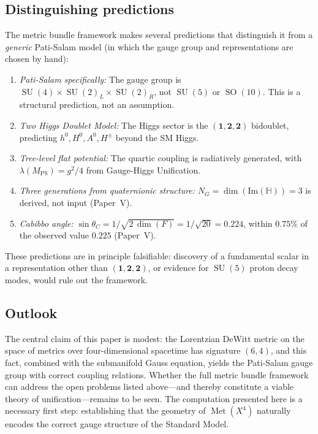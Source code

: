 \documentclass[12pt,a4paper]{article}
\theoremstyle{definition}
\newcommand{\Met}{\operatorname{Met}}
\newcommand{\SO}{\operatorname{SO}}
\newcommand{\SU}{\operatorname{SU}}
\begin{document}
\subsection{Distinguishing predictions}

The metric bundle framework makes several predictions that distinguish it from a \emph{generic} Pati-Salam model (in which the gauge group and representations are chosen by hand):
\begin{enumerate}[nosep]
\item \emph{Pati-Salam specifically:} The gauge group is $\SU(4) \times \SU(2)_L \times \SU(2)_R$, not $\SU(5)$ or $\SO(10)$.
This is a structural prediction, not an assumption.
\item \emph{Two Higgs Doublet Model:} The Higgs sector is the $(\mathbf{1}, \mathbf{2}, \mathbf{2})$ bidoublet, predicting $h^0, H^0, A^0, H^\pm$ beyond the SM Higgs.
\item \emph{Tree-level flat potential:} The quartic coupling is radiatively generated, with $\lambda(M_{\mathrm{PS}}) = g^2/4$ from Gauge-Higgs Unification.
\item \emph{Three generations from quaternionic structure:} $N_G = \dim(\mathrm{Im}(\mathbb{H})) = 3$ is derived, not input (Paper~V).
\item \emph{Cabibbo angle:} $\sin\theta_C = 1/\sqrt{2\,\dim(F)} = 1/\sqrt{20} = 0.224$, within $0.75\%$ of the observed value $0.225$ (Paper~V).
\end{enumerate}
These predictions are in principle falsifiable: discovery of a fundamental scalar in a representation other than $(\mathbf{1}, \mathbf{2}, \mathbf{2})$, or evidence for $\SU(5)$ proton decay modes, would rule out the framework.

\subsection{Outlook}

The central claim of this paper is modest: the Lorentzian DeWitt metric on the space of metrics over four-dimensional spacetime has signature $(6,4)$, and this fact, combined with the submanifold Gauss equation, yields the Pati-Salam gauge group with correct coupling relations.
Whether the full metric bundle framework can address the open problems listed above---and thereby constitute a viable theory of unification---remains to be seen.
The computation presented here is a necessary first step: establishing that the geometry of $\Met(X^4)$ naturally encodes the correct gauge structure of the Standard Model.
\end{document}
